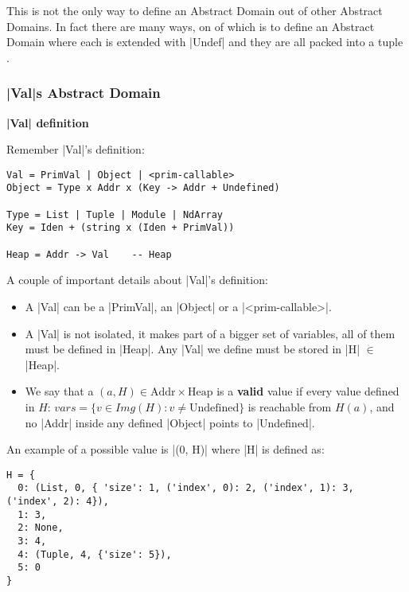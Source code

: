 This is not the only way to define an Abstract Domain out of other
Abstract Domains. In fact there are many ways, on of which is to define
an Abstract Domain where each is extended with \pycode|Undef| and they
are all packed into a tuple {}.

{}

\subsubsection{\texorpdfstring{\pycode|Val|s Abstract
Domain}{Vals Abstract Domain}}\label{vals-abstract-domain}

\noindent \textbf{\pycode|Val| definition}

Remember \pycode|Val|'s definition:

\begin{verbatim}
Val = PrimVal | Object | <prim-callable>
Object = Type x Addr x (Key -> Addr + Undefined)

Type = List | Tuple | Module | NdArray
Key = Iden + (string x (Iden + PrimVal))

Heap = Addr -> Val    -- Heap
\end{verbatim}

A couple of important details about \pycode|Val|'s definition:

\begin{itemize}
\tightlist
\item
  A \pycode|Val| can be a \pycode|PrimVal|, an \pycode|Object| or a
  \pycode|<prim-callable>|.
\item
  A \pycode|Val| is not isolated, it makes part of a bigger set of
  variables, all of them must be defined in \pycode|Heap|. Any
  \pycode|Val| we define must be stored in \pycode|H| \(\in\)
  \pycode|Heap|.
\item
  We say that a \((a, H) \in \text{Addr} \times \text{Heap}\) is a
  \textbf{valid} value if every value defined in \(H\):
  \(vars = \{v \in Img(H) : v \ne \text{Undefined}\}\) is reachable from
  \(H(a)\), and no \pycode|Addr| inside any defined \pycode|Object|
  points to \pycode|Undefined|.
\end{itemize}

An example of a possible value is \pycode|(0, H)| where \pycode|H| is
defined as:

\begin{verbatim}
H = {
  0: (List, 0, { 'size': 1, ('index', 0): 2, ('index', 1): 3, ('index', 2): 4}),
  1: 3,
  2: None,
  3: 4,
  4: (Tuple, 4, {'size': 5}),
  5: 0
}
\end{verbatim}

